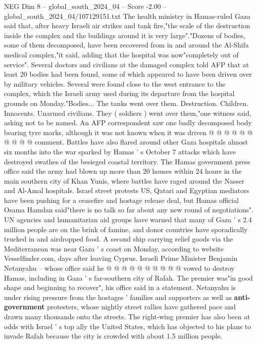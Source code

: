 \begin{textsample}{NEG Dim 8 – global\_south\_2024\_04 – Score -2.00 – global\_south\_2024\_04/107129151.txt}  \label{ex:f8_neg_032}
The health ministry in Hamas-ruled Gaza said that, after heavy Israeli air strikes and tank fire,"the scale of the destruction inside the complex and the buildings around it is very large"."Dozens of bodies, some of them decomposed, have been recovered from in and around the Al-Shifa medical complex,"it said, adding that the hospital was now"completely out of service".
Several doctors and civilians at the damaged complex told AFP that at least 20 bodies had been found, some of which appeared to have been driven over by military vehicles.
Several were found close to the west entrance to the complex, which the Israeli army used during its departure from the hospital grounds on Monday."Bodies...
The tanks went over them.
Destruction.
Children.
Innocents.
Unarmed civilians.
They ( soldiers ) went over them,"one witness said, asking not to be named.
An AFP correspondent saw one badly decomposed body bearing tyre marks, although it was not known when it was driven @ @ @ @ @ @ @ @ @ @ comment.
Battles have also flared around other Gaza hospitals almost six months into the war sparked by Hamas ' s October 7 attacks which have destroyed swathes of the besieged coastal territory.
The Hamas government press office said the army had blown up more than 20 houses within 24 hours in the main southern city of Khan Yunis, where battles have raged around the Nasser and Al-Amal hospitals.
Israel street protests US, Qatari and Egyptian mediators have been pushing for a ceasefire and hostage release deal, but Hamas official Osama Hamdan said"there is no talk so far about any new round of negotiations".
UN agencies and humanitarian aid groups have warned that many of Gaza ' s 2.4 million people are on the brink of famine, and donor countries have sporadically trucked in and airdropped food.
A second ship carrying relief goods via the Mediterranean was near Gaza ' s coast on Monday, according to website Vesselfinder.com, days after leaving Cyprus.
Israeli Prime Minister Benjamin Netanyahu -- whose office said he @ @ @ @ @ @ @ @ @ @ vowed to destroy Hamas, including in Gaza ' s far-southern city of Rafah.
The premier was"in good shape and beginning to recover", his office said in a statement.
Netanyahu is under rising pressure from the hostages ' families and supporters as well as \textbf{anti-government} protesters, whose nightly street rallies have gathered pace and drawn many thousands onto the streets.
The right-wing premier has also been at odds with Israel ' s top ally the United States, which has objected to his plans to invade Rafah because the city is crowded with about 1.5 million people.

\end{textsample}
